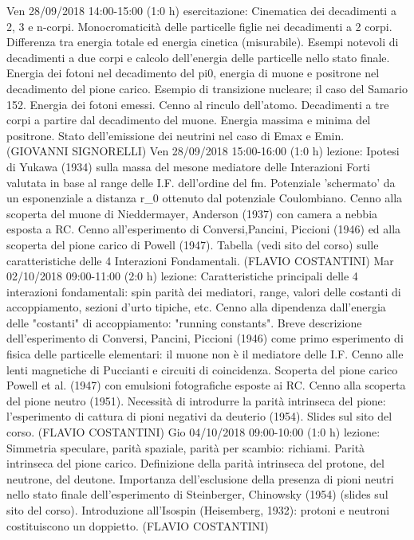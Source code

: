 \begin{itemize}
Ven 28/09/2018 14:00-15:00 (1:0 h) esercitazione: Cinematica dei decadimenti a 2, 3 e n-corpi. Monocromaticità delle particelle figlie nei decadimenti a 2 corpi. Differenza tra energia totale ed energia cinetica (misurabile). Esempi notevoli di decadimenti a due corpi e calcolo dell'energia delle particelle nello stato finale. Energia dei fotoni nel decadimento del pi0, energia di muone e positrone nel decadimento del pione carico. Esempio di transizione nucleare; il caso del Samario 152. Energia dei fotoni emessi. Cenno al rinculo dell'atomo. Decadimenti a tre corpi a partire dal decadimento del muone. Energia massima e minima del positrone. Stato dell'emissione dei neutrini nel caso di Emax e Emin. (GIOVANNI SIGNORELLI)
Ven 28/09/2018 15:00-16:00 (1:0 h) lezione: Ipotesi di Yukawa (1934) sulla massa del mesone mediatore delle Interazioni Forti valutata in base al range delle I.F. dell'ordine del fm. Potenziale 'schermato' da un esponenziale a distanza r_0 ottenuto dal potenziale Coulombiano. Cenno alla scoperta del muone di Nieddermayer, Anderson (1937) con camera a nebbia esposta a RC. Cenno all'esperimento di Conversi,Pancini, Piccioni (1946) ed alla scoperta del pione carico di Powell (1947). Tabella (vedi sito del corso) sulle caratteristiche delle 4 Interazioni Fondamentali. (FLAVIO COSTANTINI)
Mar 02/10/2018 09:00-11:00 (2:0 h) lezione: Caratteristiche principali delle 4 interazioni fondamentali: spin parità dei mediatori, range, valori delle costanti di accoppiamento, sezioni d'urto tipiche, etc. Cenno alla dipendenza dall'energia delle "costanti" di accoppiamento: "running constants". Breve descrizione dell'esperimento di Conversi, Pancini, Piccioni (1946) come primo esperimento di fisica delle particelle elementari: il muone non è il mediatore delle I.F. Cenno alle lenti magnetiche di Puccianti e circuiti di coincidenza. Scoperta del pione carico Powell et al. (1947) con emulsioni fotografiche esposte ai RC. Cenno alla scoperta del pione neutro (1951). Necessità di introdurre la parità intrinseca del pione: l'esperimento di cattura di pioni negativi da deuterio (1954). Slides sul sito del corso. (FLAVIO COSTANTINI)
Gio 04/10/2018 09:00-10:00 (1:0 h) lezione: Simmetria speculare, parità spaziale, parità per scambio: richiami. Parità intrinseca del pione carico. Definizione della parità intrinseca del protone, del neutrone, del deutone. Importanza dell'esclusione della presenza di pioni neutri nello stato finale dell'esperimento di Steinberger, Chinowsky (1954) (slides sul sito del corso). Introduzione all'Isospin (Heisemberg, 1932): protoni e neutroni costituiscono un doppietto. (FLAVIO COSTANTINI)

\end{itemize}
